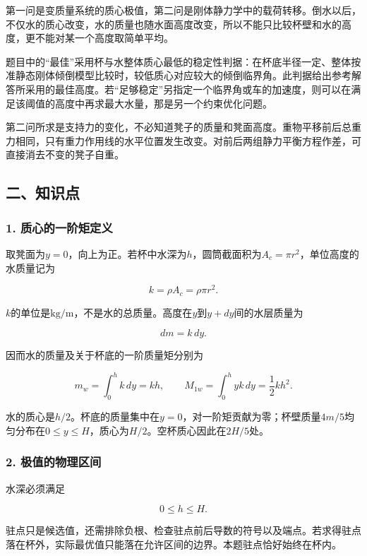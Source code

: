 \documentclass[12pt,a4paper,fontset=fandol]{ctexart}
\begin{document}
第一问是变质量系统的质心极值，第二问是刚体静力学中的载荷转移。倒水以后，不仅水的质心改变，水的质量也随水面高度改变，所以不能只比较杯壁和水的高度，更不能对某一个高度取简单平均。

题目中的``最佳''采用杯与水整体质心最低的稳定性判据：在杯底半径一定、整体按准静态刚体倾倒模型比较时，较低质心对应较大的倾倒临界角。此判据给出参考解答所采用的最佳高度。若``足够稳定''另指定一个临界角或车的加速度，则可以在满足该阈值的高度中再求最大水量，那是另一个约束优化问题。

第二问所求是支持力的变化，不必知道凳子的质量和凳面高度。重物平移前后总重力相同，只有重力作用线的水平位置发生改变。对前后两组静力平衡方程作差，可直接消去不变的凳子自重。

\subsection{二、知识点}\label{ux4e8cux77e5ux8bc6ux70b9}

\subsubsection{1.
质心的一阶矩定义}\label{ux8d28ux5fc3ux7684ux4e00ux9636ux77e9ux5b9aux4e49}

取凳面为\(y=0\)，向上为正。若杯中水深为\(h\)，圆筒截面积为\(A_c=\pi r^2\)，单位高度的水质量记为

\[
k=\rho A_c=\rho\pi r^2.
\]

\(k\)的单位是\(\mathrm{kg/m}\)，不是水的总质量。高度在\(y\)到\(y+dy\)间的水层质量为

\[
dm=k\,dy.
\]

因而水的质量及关于杯底的一阶质量矩分别为

\[
m_w=\int_0^h k\,dy=kh,
\qquad
M_{1w}=\int_0^h yk\,dy=\frac12kh^2.
\]

水的质心是\(h/2\)。杯底的质量集中在\(y=0\)，对一阶矩贡献为零；杯壁质量\(4m/5\)均匀分布在\(0\le y\le H\)，质心为\(H/2\)。空杯质心因此在\(2H/5\)处。

\subsubsection{2.
极值的物理区间}\label{ux6781ux503cux7684ux7269ux7406ux533aux95f4}

水深必须满足

\[
0\le h\le H.
\]

驻点只是候选值，还需排除负根、检查驻点前后导数的符号以及端点。若求得驻点落在杯外，实际最优值只能落在允许区间的边界。本题驻点恰好始终在杯内。
\end{document}
